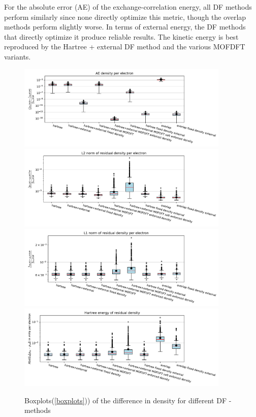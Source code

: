 For the absolute error (AE) of the exchange-correlation energy, all DF methods perform similarly since none directly optimize this metric, though the overlap methods perform slightly worse. In terms of external energy, the DF methods that directly optimize it produce reliable results. The kinetic energy is best reproduced by the Hartree + external DF method and the various MOFDFT variants.
\begin{figure}
    \includegraphics[width=0.9\textwidth]{chapters/results/results_images/AE_density_on_even_tempered_2.5_for_different_df_methods}
    \includegraphics[width=0.9\textwidth]{chapters/results/results_images/L2_residual_densities_on_even_tempered_2.5_for_different_df_methods}
    \includegraphics[width=0.9\textwidth]{chapters/results/results_images/L1_residual_densities_on_even_tempered_2.5_for_different_df_methods}
    \includegraphics[width=0.9\textwidth]{chapters/results/results_images/L2_residual_hartree_on_even_tempered_2.5_for_different_df_methods}
    \caption{Boxplots(\ref{boxplots})) of the difference in density for different DF - methods}
    \label{fig:Densities_df_methods}
\end{figure}

